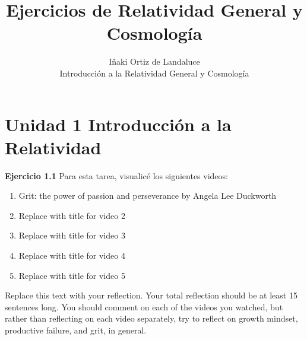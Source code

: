 \documentclass[12pt]{article}
\newenvironment{exercise}[2][Ejercicio]{\begin{trivlist} %
\item[\hskip \labelsep {\bfseries #1}\hskip \labelsep {\bfseries #2.}]}{\end{trivlist}}
\begin{document}
 
 
\title{Ejercicios de Relatividad General y Cosmología}
\author{Iñaki Ortiz de Landaluce\\ %
Introducción a la Relatividad General y Cosmología}

\maketitle

\section*{Unidad 1 Introducción a la Relatividad}
 
\noindent \textbf{Ejercicio 1.1} Para esta tarea, visualicé los siguientes videos:

\begin{enumerate}
\item Grit: the power of passion and perseverance by Angela Lee Duckworth  
\item Replace with title for video 2
\item Replace with title for video 3
\item Replace with title for video 4
\item Replace with title for video 5
\end{enumerate}

Replace this text with your reflection. Your total reflection should be at least 15 sentences long. You should comment on each of the videos you watched, but rather than reflecting on each video separately, try to reflect on growth mindset, productive failure, and grit, in general.


 
\end{document}
